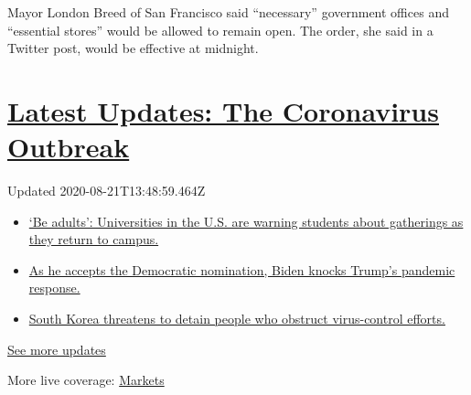 Mayor London Breed of San Francisco said ``necessary'' government
offices and ``essential stores'' would be allowed to remain open. The
order, she said in a Twitter post, would be effective at midnight.

\hypertarget{latest-updates-the-coronavirus-outbreak}{%
\section{\texorpdfstring{\href{https://www.nytimes3xbfgragh.onion/2020/08/21/world/covid-19-coronavirus.html?action=click\&pgtype=Article\&state=default\&region=MAIN_CONTENT_1\&context=storylines_live_updates}{Latest
Updates: The Coronavirus
Outbreak}}{Latest Updates: The Coronavirus Outbreak}}\label{latest-updates-the-coronavirus-outbreak}}

Updated 2020-08-21T13:48:59.464Z

\begin{itemize}
\tightlist
\item
  \href{https://www.nytimes3xbfgragh.onion/2020/08/21/world/covid-19-coronavirus.html?action=click\&pgtype=Article\&state=default\&region=MAIN_CONTENT_1\&context=storylines_live_updates\#link-6a60a19d}{`Be
  adults': Universities in the U.S. are warning students about
  gatherings as they return to campus.}
\item
  \href{https://www.nytimes3xbfgragh.onion/2020/08/21/world/covid-19-coronavirus.html?action=click\&pgtype=Article\&state=default\&region=MAIN_CONTENT_1\&context=storylines_live_updates\#link-324af071}{As
  he accepts the Democratic nomination, Biden knocks Trump's pandemic
  response.}
\item
  \href{https://www.nytimes3xbfgragh.onion/2020/08/21/world/covid-19-coronavirus.html?action=click\&pgtype=Article\&state=default\&region=MAIN_CONTENT_1\&context=storylines_live_updates\#link-191d44be}{South
  Korea threatens to detain people who obstruct virus-control efforts.}
\end{itemize}

\href{https://www.nytimes3xbfgragh.onion/2020/08/21/world/covid-19-coronavirus.html?action=click\&pgtype=Article\&state=default\&region=MAIN_CONTENT_1\&context=storylines_live_updates}{See
more updates}

More live coverage:
\href{https://www.nytimes3xbfgragh.onion/live/2020/08/21/business/stock-market-today-coronavirus?action=click\&pgtype=Article\&state=default\&region=MAIN_CONTENT_1\&context=storylines_live_updates}{Markets}

